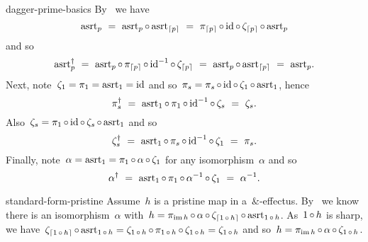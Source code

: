 \begin{solution}{dagger-prime-basics}%
By~ we have
 \begin{equation*}
    \asrt_p \ = \ 
     \asrt_p \after \asrt_{\ceil{p}}
     \ = \ \pi_{\ceil{p}} \after \id \after \zeta_{\ceil{p}} \after \asrt_p
 \end{equation*}
    and so
\begin{equation*}
    \asrt^\dagger_p \ =\  \asrt_p \after \pi_{\ceil{p}} \after \id^{-1} \after \zeta_{\ceil{p}}
        \ =\  \asrt_p \after \asrt_{\ceil{p}} \ =\  \asrt_p.
\end{equation*}
    Next, note~$\zeta_1 = \pi_1 = \mathrm{asrt}_1 = \mathrm{id}$
    and so~$\pi_s = \pi_s \mathop{\circ} \mathrm{id} \mathop{\circ} \zeta_1 \mathop{\circ} \mathrm{asrt}_1$,
    hence
\begin{equation*}
    \pi_s^\dagger 
       \ =\ \mathrm{asrt}_1 \mathop{\circ} \pi_1 \mathop{\circ} \mathrm{id}^{-1} \mathop{\circ} \zeta_s
       \ =\ \zeta_s.
\end{equation*}
Also~$\zeta_s = \pi_1 \mathop{\circ} \mathrm{id} \mathop{\circ} \zeta_s \mathop{\circ} \mathrm{asrt}_1$
    and so
\begin{equation*}
    \zeta_s^\dagger \ = \ \mathrm{asrt}_1 \mathop{\circ} \pi_s \mathop{\circ} \mathrm{id}^{-1} \mathop{\circ} \zeta_1 \ = \ \pi_s.
\end{equation*}
    Finally, note~$\alpha = \mathrm{asrt}_1 = \pi_1 \mathop{\circ} \alpha \mathop{\circ} \zeta_1$
        for any isomorphism~$\alpha$ and so
\begin{equation*}
    \alpha^\dagger \ =  \ \asrt_1 \after \pi_1 \after \alpha^{-1} \after \zeta_{1} \ = \ \alpha^{-1}.
\end{equation*}
\end{solution}
\spacingfix{}
\begin{solution}{standard-form-pristine}%
Assume~$h$ is a pristine map in a~$\&$-effectus.
By~ we know there is an isomorphism~$\alpha$
    with~$h = \pi_{\operatorname{im} h} \mathop{\circ} \alpha \mathop{\circ} \zeta_{\left\lceil1 \mathop{\circ} h\right\rceil} \mathop{\circ} \mathrm{asrt}_{1 \mathop{\circ} h}$.
As~$1 \mathop{\circ} h$ is sharp,
    we have~$\zeta_{\left\lceil1 \mathop{\circ} h\right\rceil} \mathop{\circ} \mathrm{asrt}_{1 \mathop{\circ} h}
        = \zeta_{1 \mathop{\circ} h} \mathop{\circ} \pi_{1 \mathop{\circ} h} \mathop{\circ} \zeta_{1 \mathop{\circ} h}
        = \zeta_{1 \mathop{\circ} h}$
        and so~$
    h = \pi_{\operatorname{im} h} \mathop{\circ} \alpha \mathop{\circ} \zeta_{1 \mathop{\circ} h}$.
\end{solution}

